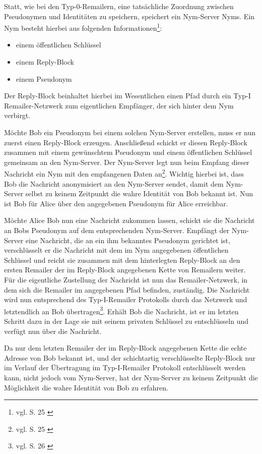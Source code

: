 Statt, wie bei den Typ-0-Remailern, eine tatsächliche Zuordnung zwischen Pseudonymen und Identitäten zu speichern, speichert ein Nym-Server Nyms.
Ein Nym besteht hierbei aus folgenden Informationen\footnote{vgl. S. 25 \cite{loesing2009privacy}}:
\begin{itemize}
\item einem öffentlichen Schlüssel
\item einem Reply-Block
\item einem Pseudonym
\end{itemize}

Der Reply-Block beinhaltet hierbei im Wesentlichen einen Pfad durch ein Typ-I Remailer-Netzwerk zum eigentlichen Empfänger, der sich hinter dem Nym verbirgt.

Möchte Bob ein Pseudonym bei einem solchen Nym-Server erstellen, muss er nun zuerst einen Reply-Block erzeugen. Anschließend schickt er diesen Reply-Block zusammen mit einem gewünschtem Pseudonym und einem öffentlichen Schlüssel gemeinsam an den Nym-Server. Der Nym-Server legt nun beim Empfang dieser Nachricht ein Nym mit den empfangenen Daten an\footnote{vgl. S. 25 \cite{loesing2009privacy}}. Wichtig hierbei ist, dass Bob die Nachricht anonymisiert an den Nym-Server sendet, damit dem Nym-Server selbst zu keinem Zeitpunkt die wahre Identität von Bob bekannt ist. Nun ist Bob für Alice über den angegebenen Pseudonym für Alice erreichbar.

Möchte Alice Bob nun eine Nachricht zukommen lassen, schickt sie die Nachricht an Bobs Pseudonym auf dem entsprechenden Nym-Server. Empfängt der Nym-Server eine Nachricht, die an ein ihm bekanntes Pseudonym gerichtet ist, verschlüsselt er die Nachricht mit dem im Nym angegebenen öffentlichen Schlüssel und reicht sie zusammen mit dem hinterlegten Reply-Block an den ersten Remailer der im Reply-Block angegebenen Kette von Remailern weiter. Für die eigentliche Zustellung der Nachricht ist nun das Remailer-Netzwerk, in dem sich die Remailer im angegebenen Pfad befinden, zuständig. Die Nachricht wird nun entsprechend des Typ-I-Remailer Protokolls durch das Netzwerk und letztendlich an Bob übertragen\footnote{vgl. S. 26 \cite{loesing2009privacy}}. Erhält Bob die Nachricht, ist er im letzten Schritt dazu in der Lage sie mit seinem privaten Schlüssel zu entschlüsseln und verfügt nun über die Nachricht. 

Da nur dem letzten Remailer der im Reply-Block angegebenen Kette die echte Adresse von Bob bekannt ist, und der schichtartig verschlüsselte Reply-Block nur im Verlauf der Übertragung im Typ-I-Remailer Protokoll entschlüsselt werden kann, nicht jedoch vom Nym-Server, hat der Nym-Server zu keinem Zeitpunkt die Möglichkeit die wahre Identität von Bob zu erfahren. 

